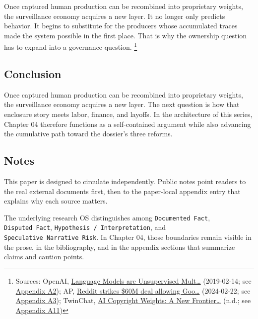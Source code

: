 \documentclass[
  american,
  11pt,
  letterpaper,
]{article}
\begin{document}
Once captured human production can be recombined into proprietary
weights, the surveillance economy acquires a new layer. It no longer
only predicts behavior. It begins to substitute for the producers whose
accumulated traces made the system possible in the first place. That is
why the ownership question has to expand into a governance question.
\footnote{Sources: OpenAI,
  \href{https://cdn.openai.com/better-language-models/language_models_are_unsupervised_multitask_learners.pdf}{Language
  Models are Unsupervised Mult\ldots{}} (2019-02-14; see
  \hyperref[ch-04-appendix-a2-language-models-are-unsupervised-multitask-learners]{Appendix
  A2}); AP,
  \href{https://apnews.com/article/a7f131c7cb4225307134ef21d3c6a708}{Reddit
  strikes \$60M deal allowing Goo\ldots{}} (2024-02-22; see
  \hyperref[ch-04-appendix-a3-reddit-strikes-60m-deal-allowing-google-to-train-ai-models-on-its-posts-unveils-ipo-plans]{Appendix
  A3}); TwinChat,
  \href{https://medium.com/twinchat/ai-copyright-weights-a-new-frontier-in-intellectual-property-law-d8ee1b6c55ee}{AI
  Copyright Weights: A New Frontier\ldots{}} (n.d.; see
  \hyperref[ch-04-appendix-a11-ai-copyright-weights-a-new-frontier-in-intellectual-property-law]{Appendix
  A11})}

\subsection{Conclusion}\label{conclusion-4}

Once captured human production can be recombined into proprietary
weights, the surveillance economy acquires a new layer. The next
question is how that enclosure story meets labor, finance, and layoffs.
In the architecture of this series, Chapter 04 therefore functions as a
self-contained argument while also advancing the cumulative path toward
the dossier's three reforms.

\subsection{Notes}\label{notes-4}

This paper is designed to circulate independently. Public notes point
readers to the real external documents first, then to the paper-local
appendix entry that explains why each source matters.

The underlying research OS distinguishes among
\texttt{Documented\ Fact}, \texttt{Disputed\ Fact},
\texttt{Hypothesis\ /\ Interpretation}, and
\texttt{Speculative\ Narrative\ Risk}. In Chapter 04, those boundaries
remain visible in the prose, in the bibliography, and in the appendix
sections that summarize claims and caution points.
\end{document}
